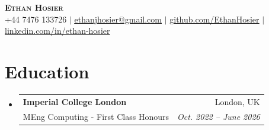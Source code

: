 \documentclass[letterpaper,11pt]{article}
\makeatletter
\newcommand{\resumeItem}[1]{
  \item\small{
    {#1\vspace{-2pt}}
  }
}
\newcommand{\resumeSubheading}[4]{
  \item
    \begin{tabular*}{0.97\textwidth}[t]{l@{\extracolsep{\fill}}r}
      \textbf{#1} & #2 \\
      \textnormal{\small#3} & \textit{\small #4} \\
    \end{tabular*}\vspace{-7pt}
}
\newcommand{\resumeProjectHeading}[2]{
    \item
    \begin{tabular*}{0.97\textwidth}{l@{\extracolsep{\fill}}r}
      \small#1 & #2 \\
    \end{tabular*}\vspace{-7pt}
}
\newcommand{\resumeSubHeadingListStart}{\begin{itemize}[leftmargin=0.15in, label={}]}
\newcommand{\resumeSubHeadingListEnd}{\end{itemize}}
\newcommand{\resumeItemListStart}{\begin{itemize}}
\newcommand{\resumeItemListEnd}{\end{itemize}\vspace{-5pt}}
\makeatother
\begin{document}

\begin{center}
    \textbf{\Huge \scshape Ethan Hosier} \\ \vspace{3pt}
    \small +44 7476 133726 $|$ \href{mailto:ethanjhosier@gmail.com}{\underline{ethanjhosier@gmail.com}} $|$ 
    \href{https://github.com/EthanHosier}{\underline{github.com/EthanHosier}} $|$
    \href{https://www.linkedin.com/in/ethan-hosier}{\underline{linkedin.com/in/ethan-hosier}}
\end{center}


\section{Education}
  \resumeSubHeadingListStart
    \resumeSubheading
      {Imperial College London}{London, UK}
      {MEng Computing - First Class Honours}{Oct. 2022 -- June 2026}
  \resumeSubHeadingListEnd

\end{document}
